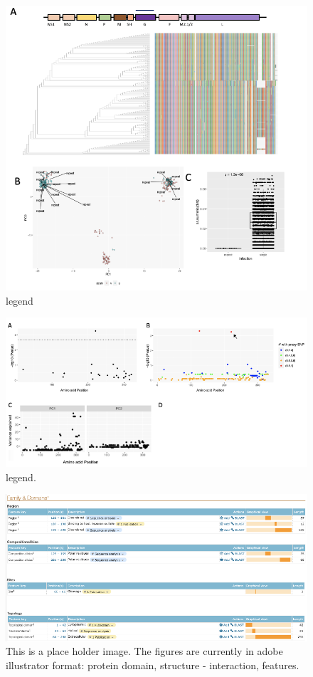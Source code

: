 \documentclass{article}
\begin{document}
\begin{figure}[ht] \hspace*{0cm}
    \includegraphics[scale=0.4]{f2}
	\caption{legend}
	\label{fig:2} \end{figure}

\begin{figure}[ht] \hspace*{0cm}
    \includegraphics[scale=0.4]{f3}
	\caption{legend.}
	\label{fig:3} \end{figure}
	
	\begin{figure}[ht] \hspace*{0cm}
    \includegraphics[scale=0.4]{f4}
	\caption{This is a place holder image. The figures are currently in adobe illustrator format: protein domain, structure - interaction, features.}
	\label{fig:4} \end{figure}
	
\end{document}
